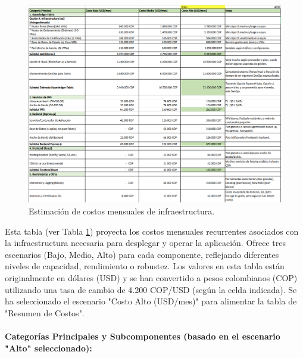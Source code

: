 \begin{figure}[htbp]
    \centering
    \includegraphics[width=\textwidth]{Images/costos2.png}
    \caption{Estimación de costos mensuales de infraestructura.}
    \label{fig:costos2}
\end{figure}

Esta tabla (ver Tabla \ref{fig:costos2}) proyecta los costos mensuales recurrentes asociados con la infraestructura necesaria para desplegar y operar la aplicación. Ofrece tres escenarios (Bajo, Medio, Alto) para cada componente, reflejando diferentes niveles de capacidad, rendimiento o robustez. Los valores en esta tabla están originalmente en dólares (USD) y se han convertido a pesos colombianos (COP) utilizando una tasa de cambio de 4.200 COP/USD (según la celda indicada). Se ha seleccionado el escenario "Costo Alto (USD/mes)" para alimentar la tabla de "Resumen de Costos". 

\paragraph{Categorías Principales y Subcomponentes (basado en el escenario "Alto" seleccionado): }


